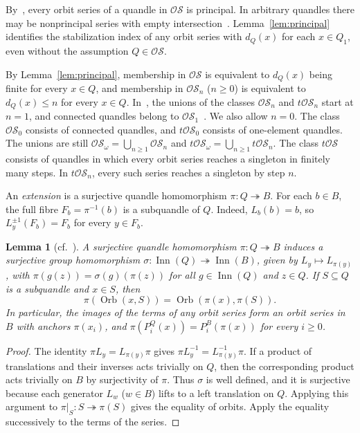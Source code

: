 \documentclass[11pt,a4paper]{article}
\newtheorem{lemma}[theorem]{Lemma}
\theoremstyle{remark}
\newcommand{\OS}{\mathcal{OS}}
\newcommand{\tOS}{t\mathcal{OS}}
\newcommand{\Inn}{\operatorname{Inn}}
\newcommand{\Orb}{\operatorname{Orb}}
\begin{document}
By~\cite[Corollary~4.7]{BCNW}, every orbit series of a quandle in
\(\OS\) is principal. In arbitrary quandles there may be nonprincipal
series with empty intersection~\cite[Example~4.9]{BCNW}.
Lemma~\ref{lem:principal} identifies the stabilization index of any
orbit series with \(d_Q(x)\) for each \(x\in Q_1\), even without
the assumption \(Q\in\OS\).

By Lemma~\ref{lem:principal}, membership in \(\OS\) is equivalent to
\(d_Q(x)\) being finite for every \(x\in Q\), and membership in
\(\OS_n\) (\(n\ge 0\)) is equivalent to \(d_Q(x)\le n\) for every
\(x\in Q\). In~\cite[Section~4.1]{BCNW}, the unions of the classes
\(\OS_n\) and \(\tOS_n\) start at \(n=1\), and connected quandles
belong to \(\OS_1\)~\cite[Example~4.3]{BCNW}. We also allow \(n=0\).
The class \(\OS_0\) consists of connected quandles, and \(\tOS_0\)
consists of one-element quandles. The unions are still
\(\OS_\omega=\bigcup_{n\ge 1}\OS_n\) and
\(\tOS_\omega=\bigcup_{n\ge 1}\tOS_n\).
The class \(\tOS\) consists of quandles in which every orbit series
reaches a singleton in finitely many steps. In \(\tOS_n\), every
such series reaches a singleton by step \(n\).

An \emph{extension} is a surjective quandle homomorphism
\(\pi\colon Q\twoheadrightarrow B\). For each \(b\in B\), the full
fibre \(F_b=\pi^{-1}(b)\) is a subquandle of \(Q\). Indeed,
\(L_b(b)=b\), so \(L_y^{\pm 1}(F_b)=F_b\) for every \(y\in F_b\).

\begin{lemma}[cf.~{\cite[Section~2.2 and Lemma~5.1]{BCNW}}]\label{lem:images}
A surjective quandle homomorphism \(\pi\colon Q\twoheadrightarrow B\)
induces a surjective group homomorphism
\(\sigma\colon\Inn(Q)\twoheadrightarrow\Inn(B)\), given by
\(L_y\mapsto L_{\pi(y)}\), with
\(\pi(g(z))=\sigma(g)(\pi(z))\) for all \(g\in\Inn(Q)\) and \(z\in Q\).
If \(S\subseteq Q\) is a subquandle and \(x\in S\), then
\[
  \pi(\Orb(x,S))=\Orb(\pi(x),\pi(S)).
\]
In particular, the images of the terms of any orbit series form an
orbit series in \(B\) with anchors \(\pi(x_i)\), and
\(\pi(P_i^Q(x))=P_i^B(\pi(x))\) for every \(i\ge 0\).
\end{lemma}

\begin{proof}
The identity \(\pi L_y=L_{\pi(y)}\pi\) gives
\(\pi L_y^{-1}=L_{\pi(y)}^{-1}\pi\). If a product of translations
and their inverses acts trivially on \(Q\), then the corresponding
product acts trivially on \(B\) by surjectivity of \(\pi\). Thus
\(\sigma\) is well defined, and it is surjective because each
generator \(L_w\) (\(w\in B\)) lifts to a left translation on \(Q\).
Applying this argument to
\(\pi|_S\colon S\twoheadrightarrow\pi(S)\) gives the equality of
orbits. Apply the equality successively to the terms of the series.
\end{proof}
\end{document}
